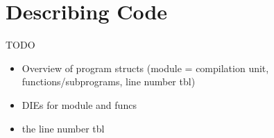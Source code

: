 
\section{Describing Code}


\begin{frame}{TODO}
\begin{itemize}
\item Overview of program structs (module = compilation unit, functions/subprograms, line number tbl)
\item DIEs for module and funcs
\item the line number tbl 
\end{itemize}
\end{frame}
